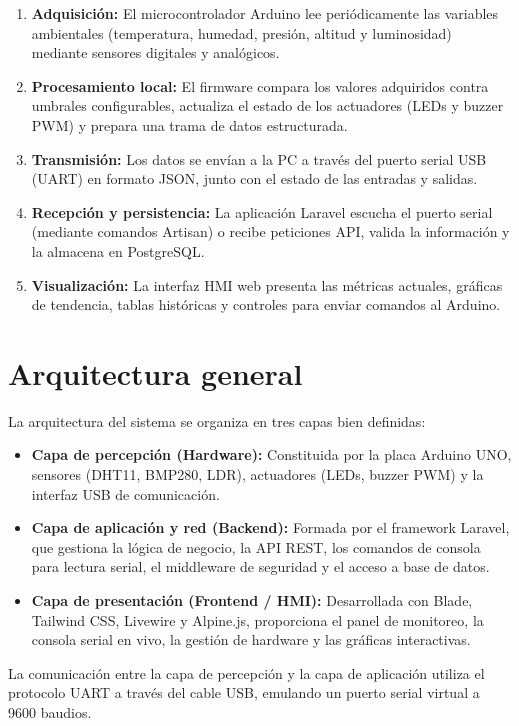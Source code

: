 \begin{enumerate}[leftmargin=*]
    \item \textbf{Adquisición:} El microcontrolador Arduino lee periódicamente las variables ambientales (temperatura, humedad, presión, altitud y luminosidad) mediante sensores digitales y analógicos.
    \item \textbf{Procesamiento local:} El firmware compara los valores adquiridos contra umbrales configurables, actualiza el estado de los actuadores (LEDs y buzzer PWM) y prepara una trama de datos estructurada.
    \item \textbf{Transmisión:} Los datos se envían a la PC a través del puerto serial USB (UART) en formato JSON, junto con el estado de las entradas y salidas.
    \item \textbf{Recepción y persistencia:} La aplicación Laravel escucha el puerto serial (mediante comandos Artisan) o recibe peticiones API, valida la información y la almacena en PostgreSQL.
    \item \textbf{Visualización:} La interfaz HMI web presenta las métricas actuales, gráficas de tendencia, tablas históricas y controles para enviar comandos al Arduino.
\end{enumerate}

\section{Arquitectura general}

La arquitectura del sistema se organiza en tres capas bien definidas:

\begin{itemize}[leftmargin=*]
    \item \textbf{Capa de percepción (Hardware):} Constituida por la placa Arduino UNO, sensores (DHT11, BMP280, LDR), actuadores (LEDs, buzzer PWM) y la interfaz USB de comunicación.
    \item \textbf{Capa de aplicación y red (Backend):} Formada por el framework Laravel, que gestiona la lógica de negocio, la API REST, los comandos de consola para lectura serial, el middleware de seguridad y el acceso a base de datos.
    \item \textbf{Capa de presentación (Frontend / HMI):} Desarrollada con Blade, Tailwind CSS, Livewire y Alpine.js, proporciona el panel de monitoreo, la consola serial en vivo, la gestión de hardware y las gráficas interactivas.
\end{itemize}

La comunicación entre la capa de percepción y la capa de aplicación utiliza el protocolo UART a través del cable USB, emulando un puerto serial virtual a 9600 baudios.


